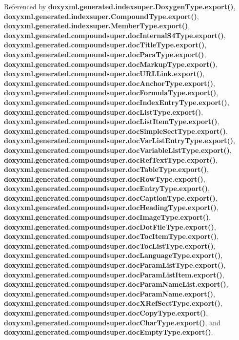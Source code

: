 Referenced by {\bf doxyxml.\+generated.\+indexsuper.\+Doxygen\+Type.\+export()}, {\bf doxyxml.\+generated.\+indexsuper.\+Compound\+Type.\+export()}, {\bf doxyxml.\+generated.\+indexsuper.\+Member\+Type.\+export()}, {\bf doxyxml.\+generated.\+compoundsuper.\+doc\+Internal\+S4\+Type.\+export()}, {\bf doxyxml.\+generated.\+compoundsuper.\+doc\+Title\+Type.\+export()}, {\bf doxyxml.\+generated.\+compoundsuper.\+doc\+Para\+Type.\+export()}, {\bf doxyxml.\+generated.\+compoundsuper.\+doc\+Markup\+Type.\+export()}, {\bf doxyxml.\+generated.\+compoundsuper.\+doc\+U\+R\+L\+Link.\+export()}, {\bf doxyxml.\+generated.\+compoundsuper.\+doc\+Anchor\+Type.\+export()}, {\bf doxyxml.\+generated.\+compoundsuper.\+doc\+Formula\+Type.\+export()}, {\bf doxyxml.\+generated.\+compoundsuper.\+doc\+Index\+Entry\+Type.\+export()}, {\bf doxyxml.\+generated.\+compoundsuper.\+doc\+List\+Type.\+export()}, {\bf doxyxml.\+generated.\+compoundsuper.\+doc\+List\+Item\+Type.\+export()}, {\bf doxyxml.\+generated.\+compoundsuper.\+doc\+Simple\+Sect\+Type.\+export()}, {\bf doxyxml.\+generated.\+compoundsuper.\+doc\+Var\+List\+Entry\+Type.\+export()}, {\bf doxyxml.\+generated.\+compoundsuper.\+doc\+Variable\+List\+Type.\+export()}, {\bf doxyxml.\+generated.\+compoundsuper.\+doc\+Ref\+Text\+Type.\+export()}, {\bf doxyxml.\+generated.\+compoundsuper.\+doc\+Table\+Type.\+export()}, {\bf doxyxml.\+generated.\+compoundsuper.\+doc\+Row\+Type.\+export()}, {\bf doxyxml.\+generated.\+compoundsuper.\+doc\+Entry\+Type.\+export()}, {\bf doxyxml.\+generated.\+compoundsuper.\+doc\+Caption\+Type.\+export()}, {\bf doxyxml.\+generated.\+compoundsuper.\+doc\+Heading\+Type.\+export()}, {\bf doxyxml.\+generated.\+compoundsuper.\+doc\+Image\+Type.\+export()}, {\bf doxyxml.\+generated.\+compoundsuper.\+doc\+Dot\+File\+Type.\+export()}, {\bf doxyxml.\+generated.\+compoundsuper.\+doc\+Toc\+Item\+Type.\+export()}, {\bf doxyxml.\+generated.\+compoundsuper.\+doc\+Toc\+List\+Type.\+export()}, {\bf doxyxml.\+generated.\+compoundsuper.\+doc\+Language\+Type.\+export()}, {\bf doxyxml.\+generated.\+compoundsuper.\+doc\+Param\+List\+Type.\+export()}, {\bf doxyxml.\+generated.\+compoundsuper.\+doc\+Param\+List\+Item.\+export()}, {\bf doxyxml.\+generated.\+compoundsuper.\+doc\+Param\+Name\+List.\+export()}, {\bf doxyxml.\+generated.\+compoundsuper.\+doc\+Param\+Name.\+export()}, {\bf doxyxml.\+generated.\+compoundsuper.\+doc\+X\+Ref\+Sect\+Type.\+export()}, {\bf doxyxml.\+generated.\+compoundsuper.\+doc\+Copy\+Type.\+export()}, {\bf doxyxml.\+generated.\+compoundsuper.\+doc\+Char\+Type.\+export()}, and {\bf doxyxml.\+generated.\+compoundsuper.\+doc\+Empty\+Type.\+export()}.



